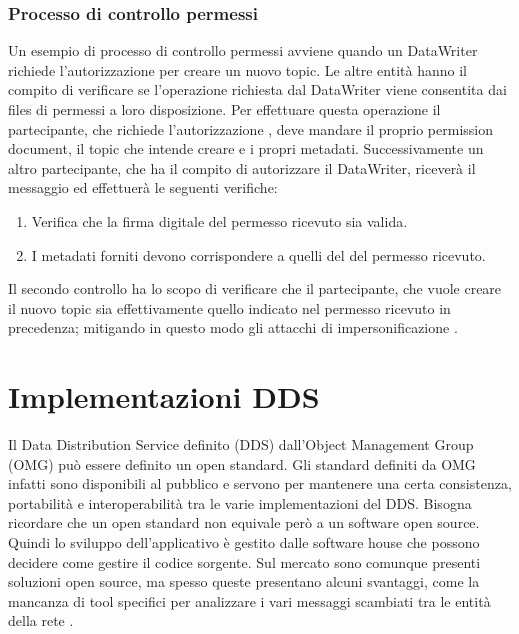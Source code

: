 \subsubsection{Processo di controllo permessi}
Un esempio di processo di controllo permessi avviene
quando un DataWriter richiede l'autorizzazione per creare un nuovo topic.
Le altre entità hanno il compito di verificare se l'operazione 
richiesta dal DataWriter viene consentita
dai files di permessi a loro disposizione. Per effettuare 
questa operazione il partecipante, che richiede l'autorizzazione ,
deve mandare il proprio permission document, il topic che intende creare e 
i propri metadati. Successivamente un altro partecipante,
che ha il compito di autorizzare il DataWriter,
riceverà il messaggio ed effettuerà le seguenti
verifiche:
\begin{enumerate}
    \item Verifica che la firma digitale del permesso ricevuto sia valida.
    \item I metadati forniti devono corrispondere a quelli del del 
    permesso ricevuto.
\end{enumerate}
Il secondo controllo ha lo scopo di verificare
che il partecipante, che vuole creare il 
nuovo topic sia effettivamente quello indicato nel permesso 
ricevuto in precedenza; mitigando in questo modo gli attacchi di 
impersonificazione 
\cite{DBLP:conf/asiaccs/WangLG24}.

\section{Implementazioni DDS}
Il Data Distribution Service definito (DDS) dall'Object Management
Group (OMG) può essere definito un open standard. Gli standard
definiti da OMG infatti sono disponibili al pubblico e servono  
per mantenere una certa consistenza, portabilità e interoperabilità
tra le varie implementazioni del DDS. Bisogna ricordare che un open 
standard non equivale però a un software open source. Quindi lo
sviluppo dell'applicativo è gestito dalle software house che possono 
decidere come gestire il codice sorgente. Sul mercato sono comunque presenti
soluzioni open source, ma spesso queste presentano alcuni svantaggi,
come la mancanza di tool specifici per analizzare i vari messaggi 
scambiati tra le entità della rete \cite{DDSimplementationRTI}.




